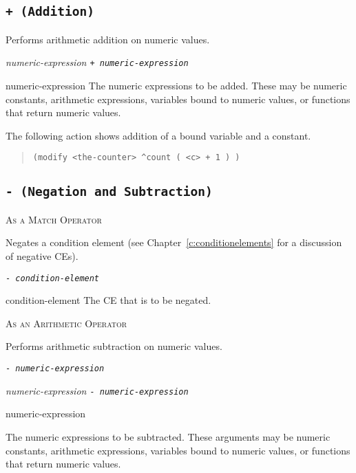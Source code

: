 \subsection{\tt{+} (Addition)}

Performs arithmetic addition on numeric values.

\Format

\it{numeric-expression} \tt{+} \it{numeric-expression}

\begin{operands}
\item[numeric-expression] The numeric expressions to be
  added. These may be numeric constants, arithmetic expressions,
  variables bound to numeric values, or functions that return numeric
  values.
\end{operands}

\Example

The following action shows addition of a bound variable and a
constant.

\begin{quote}
\begin{verbatim}
(modify <the-counter> ^count ( <c> + 1 ) )
\end{verbatim}
\end{quote}

\subsection{\tt- (Negation and Subtraction)}

\textsc{As a Match Operator}

Negates a condition element (see Chapter~\ref{c:conditionelements} for
a discussion of negative CEs).

\Format

\tt- \it{condition-element}

\begin{operands}
\item[condition-element] The CE that is to be negated.
\end{operands}

\textsc{As an Arithmetic Operator}

Performs arithmetic subtraction on numeric values.

\Format

\tt- \it{numeric-expression}

\it{numeric-expression} \tt- \it{numeric-expression}

\begin{operands}
\item[numeric-expression]

  The numeric expressions to be subtracted. These arguments may be
  numeric constants, arithmetic expressions, variables bound to
  numeric values, or functions that return numeric values.
\end{operands}
  
